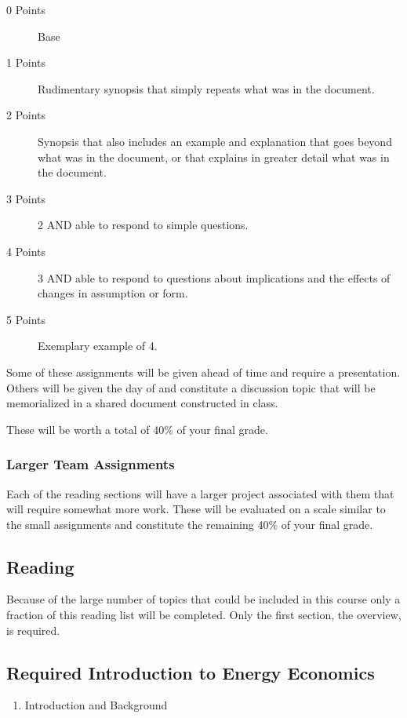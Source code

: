 \documentclass[letterpaper,10pt]{article}
\begin{document}
\begin{description}
\item[0 Points] Base
 \item[1 Points] Rudimentary synopsis that simply repeats what was in the document.
 \item[2 Points] Synopsis that also includes an example and explanation that goes beyond what was in the document, or that explains in greater detail what was in the document.
 \item[3 Points] 2 AND able to respond to simple questions.
 \item[4 Points] 3 AND able to respond to questions about implications and the effects of changes in assumption or form.
 \item[5 Points] Exemplary example of 4. 
 \end{description}

Some of these assignments will be given ahead of time and require a presentation.  Others will be given the day of and constitute a discussion topic that will be memorialized in a shared document constructed in class.

These will be worth a total of 40\% of your final grade.

\subsubsection{Larger Team Assignments}

Each of the reading sections will have a larger project associated with them that will require somewhat more work.  These will be evaluated on a scale similar to the small assignments and constitute the remaining 40\% of your final grade.


\subsection{Reading}

Because of the large number of topics that could be included in this course only a fraction of this reading list will be completed.  Only the first section, the overview, is required.

\subsection{Required Introduction to Energy Economics}
  \begin{enumerate}
    \item Introduction and Background
  
  \end{enumerate}
  
\end{document}
